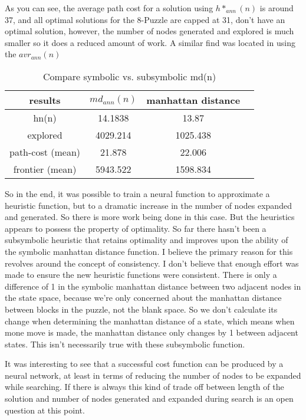 \documentclass[a4, 12pt]{article}
\begin{document}
As you can see, the average path cost for a solution using $h*_{ann}(n)$ is around 37, and all optimal solutions for the 8-Puzzle are capped at 31, don't have an optimal solution, however, the number of nodes generated and explored is much smaller so it does a reduced amount of work. A similar find was located in using the $avr_{ann}(n)$ 

\begin{table}[h!]
\centering
\caption{Compare symbolic vs. subsymbolic md(n)}
\begin{tabular}{c c c c }
 results & $md_{ann}(n)$  & manhattan distance \\
\hline
 hn(n) &   14.1838 & 13.87  \\
explored &  4029.214 &  1025.438 \\
path-cost (mean)& 21.878 & 22.006 \\
frontier (mean) & 5943.522 & 1598.834 \\ 
\end{tabular}
\end{table}

So in the end, it was possible to train a neural function to approximate a heuristic function, but to a dramatic increase in the number of nodes expanded and generated. So there is more work being done in this case. But the heuristics appears to possess the property of optimality. So far there hasn't been a subsymbolic heuristic that retains optimality and improves upon the ability of the symbolic manhattan distance function. 
I believe the primary reason for this revolves around the concept of consistency. I don't believe that enough effort was made to ensure the new heuristic functions were consistent. There is only a difference of 1 in the symbolic manhattan distance between two adjacent nodes in the state space, because we're only concerned about the manhattan distance between blocks in the puzzle, not the blank space. So we don't calculate its change when determining the manhattan distance of a state, which means when mone move is made, the manhattan distance only changes by 1 between adjacent states. This isn't necessarily true with these subsymbolic function.  

It was interesting to see that a successful cost function can be produced by a neural network, at least in terms of reducing the number of nodes to be expanded while searching. If there is always this kind of trade off between length of the solution and number of nodes generated and expanded during search is an open question at this point.

\nocite{*}


\end{document}
